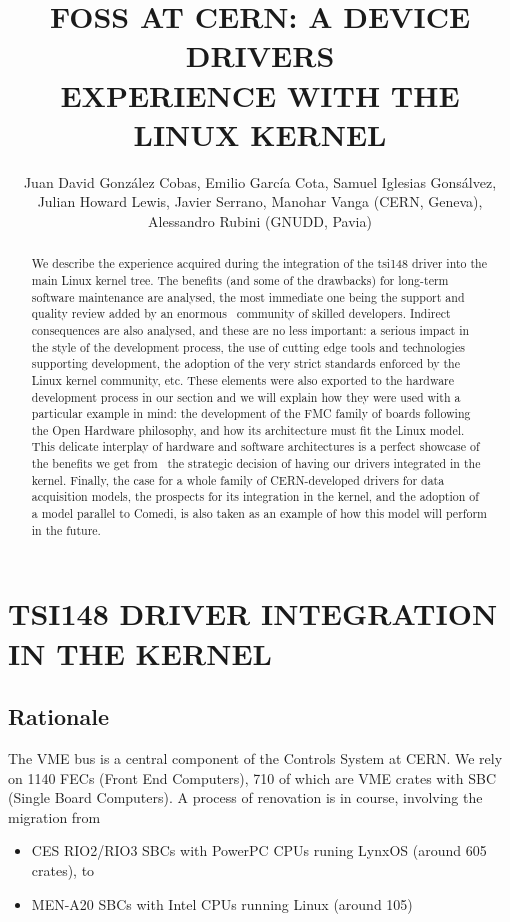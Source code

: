 \documentclass{JAC2003}
\title{FOSS AT CERN: A DEVICE DRIVERS\\
	EXPERIENCE WITH THE LINUX KERNEL}
\author{%
	Juan David Gonz\'alez Cobas, Emilio Garc\'ia Cota,
	Samuel Iglesias Gons\'alvez,\\
	Julian Howard Lewis, Javier Serrano, Manohar Vanga (CERN, Geneva),\\ 
	Alessandro Rubini (GNUDD, Pavia)}
\begin{document}
\maketitle

\vspace{2pc}

\begin{abstract}
    We describe the experience acquired during the integration of the tsi148 driver
    into the main Linux kernel tree. The benefits (and some of the drawbacks) for
    long-term software maintenance are analysed, the most immediate one being the
    support and quality review added by an enormous  community of skilled
    developers. Indirect consequences are also analysed, and these are no less
    important: a serious impact in the style of the development process, the use of
    cutting edge tools and technologies supporting development, the adoption of the
    very strict standards enforced by the Linux kernel community, etc. These
    elements were also exported to the hardware development process in our section
    and we will explain how they were used with a particular example in mind: the
    development of the FMC family of boards following the Open Hardware philosophy,
    and how its architecture must fit the Linux model. This delicate interplay of
    hardware and software architectures is a perfect showcase of the benefits we
    get from  the strategic decision of having our drivers integrated in the
    kernel.  Finally, the case for a whole family of CERN-developed drivers for
    data acquisition models, the prospects for its integration in the kernel, and
    the adoption of a model parallel to Comedi, is also taken as an example of how
    this model will perform in the future.
\end{abstract}


\section{TSI148 DRIVER INTEGRATION IN THE KERNEL}
\subsection{Rationale}
The VME bus is a central component of the Controls System at CERN. We 
rely on 1140 FECs (Front End Computers), 710 of which are VME crates
with SBC (Single Board Computers). A process of renovation is in course,
involving the migration from 
\begin{itemize}
\item CES RIO2/RIO3 SBCs with PowerPC CPUs runing LynxOS (around 605 crates), to
\item MEN-A20 SBCs with Intel CPUs running Linux (around 105)
\end{itemize}
\end{document}
